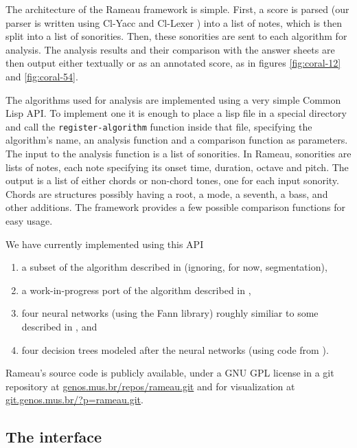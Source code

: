 \documentclass{article}
\begin{document}
The architecture of the Rameau framework is simple. First, a score is
parsed (our parser is written using Cl-Yacc
\cite{chroboczek:cl-yacc} and Cl-Lexer
\cite{parker:lexer}) into a list of notes, which is then split
into a list of sonorities. Then, these sonorities are sent to each
algorithm for analysis. The analysis results and their comparison with
the answer sheets are then output either textually or as an annotated
score, as in figures \ref{fig:coral-12} and \ref{fig:coral-54}.

The algorithms used for analysis are implemented using a very simple
Common Lisp API. To implement one it is enough to place a lisp file in
a special directory and call the \texttt{register-algorithm} function
inside that file, specifying the algorithm's name, an analysis
function and a comparison function as parameters. The input to the
analysis function is a list of sonorities. In Rameau, sonorities are
lists of notes, each note specifying its onset time, duration, octave
and pitch. The output is a list of either chords or non-chord tones,
one for each input sonority. Chords are structures possibly having a
root, a mode, a seventh, a bass, and other additions. The
framework provides a few possible comparison functions for easy
usage.

We have currently implemented using this API 
\begin{enumerate}
\item a subset of the algorithm described in \cite{pardo.ea:algorithms}
  (ignoring, for now, segmentation), 
\item a work-in-progress port of the algorithm described in
  \cite{temperley.ea:modeling}, 
\item four neural networks (using the Fann \cite{nissen:fann}
  library) roughly similiar to some described in
  \cite{tsui:harmonic}, and
\item four decision trees modeled after the neural networks (using code
  from \cite{mitchell:machine}).
\end{enumerate}

Rameau's source code is publicly available, under a GNU GPL
\cite{fsf:gpl} license in a git \cite{baudis:git}
repository at \url{genos.mus.br/repos/rameau.git} and for
visualization at \url{git.genos.mus.br/?p=rameau.git}.

\subsection{The interface}
\label{sec:analysis-output}
\end{document}
